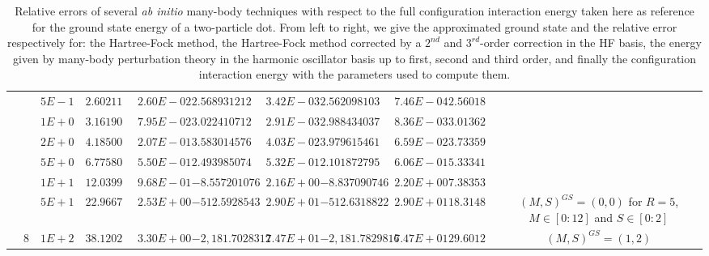 \begin{landscape}
\begin{table}[ht]
{\begin{tabular}[c]{c|c|c|c|c|c|c|c|c|c|c}
& &$5E-1$ & $2.602114062463$ & $2.60E-02$ & $2.568931212534$ & $3.42E-03$ & $2.562098103678$ & $7.46E-04$ & $2.560187735597$ & \\
& &$1E+0$ & $3.161908943210$ & $7.95E-02$ & $3.022410712821$ & $2.91E-03$ & $2.988434037364$ & $8.36E-03$ & $3.013626129397$ & \\
& &$2E+0$ & $4.185004164083$ & $2.07E-01$ & $3.583014576652$ & $4.03E-02$ & $3.979615461021$ & $6.59E-02$ & $3.733597603174$ & \\
& &$5E+0$ & $6.775808076626$ & $5.50E-01$ & $2.493985074207$ & $5.32E-01$ & $2.101872795883$ & $6.06E-01$ & $5.333416434792$ & \\
& &$1E+1$ & $12.039973698080$ & $9.68E-01$ & $-8.557201076326$ & $2.16E+00$ & $-8.837090746698$ & $2.20E+00$ & $7.383537264058$ & \\
& &$5E+1$ & $22.966747273068$ & $2.53E+00$ & $-512.592854371255$ & $2.90E+01$ & $-512.631882219133$ & $2.90E+01$ & $18.314898304163$ & \multirow{-22}{3cm}{$(M,S)^{GS}=(0,0)$ for $R=5$, $M\in[0:12]$ and $S\in[0:2]$}  \\ \cline{10-11}
& \multirow{-23}{*}{8} &$1E+2$ & $38.120267705447$ & $3.30E+00$ & $-2,181.702831216570$ & $7.47E+01$ & $-2,181.782981607800$ & $7.47E+01$ & $29.601244919262$ &  \multirow{-1}{3cm}{$(M,S)^{GS}=(1,2)$} \\
\toprule[1pt]
\end{tabular}
}
 \caption{Relative errors of several \textit{ab initio} many-body techniques with respect to the full configuration interaction energy taken here as reference for the ground state energy of a two-particle dot. From left to right, we give the approximated ground state and the relative error respectively for: the Hartree-Fock method, the Hartree-Fock method corrected by a $2^{nd}$ and $3^{rd}$-order correction in the HF basis, the energy given by many-body perturbation theory in the harmonic oscillator basis up to first, second and third order, and finally the configuration interaction energy with the parameters used to compute them.}
\label{tab:comparisonMethods02ePT} 
\end{table} 
\end{landscape}


